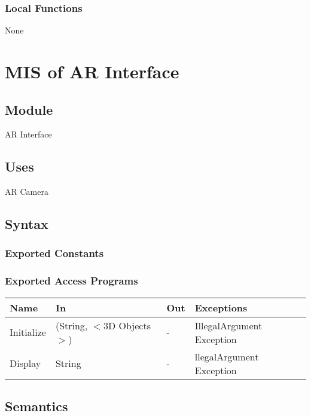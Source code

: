 \documentclass[12pt, titlepage]{article}
\begin{document}
\subsubsection{Local Functions}

None

\newpage

\section{MIS of AR Interface} \label{mARInterface}

\subsection{Module}

AR Interface

\subsection{Uses}

AR Camera

\subsection{Syntax}

\subsubsection{Exported Constants}

\subsubsection{Exported Access Programs}

\begin{center}
\begin{tabular}{p{2cm} p{4cm} p{4cm} p{2cm}}
\hline
\textbf{Name} & \textbf{In} & \textbf{Out} & \textbf{Exceptions} \\
\hline
Initialize & (String, $<$3D Objects$>$) & - & IllegalArgument Exception\\
Display & String & - & llegalArgument Exception \\

\hline
\end{tabular}
\end{center}

\subsection{Semantics}
\end{document}
